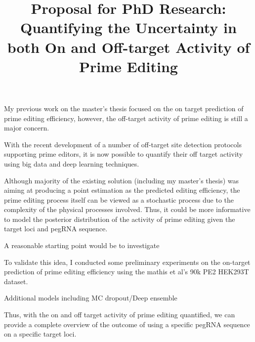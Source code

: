 \documentclass[a4,12pt]{article}
\title{Proposal for PhD Research: 
Quantifying the Uncertainty in both On and Off-target Activity of Prime Editing}
\author{}
\date{}
\begin{document}
\maketitle

My previous work on the master's thesis focused on the on target prediction of prime editing efficiency, however, the off-target activity of prime editing is still a major concern. 

With the recent development of a number of off-target site detection protocols supporting prime editors, it is now possible to quantify their off target activity using big data and deep learning techniques\parencite{liangGenomewideProfilingPrime2023,
zhuTrackingseqRevealsHeterogeneity2024}.

Although majority of the existing solution (including my master's thesis) was aiming at producing a point estimation as the predicted editing efficiency\parencite{mathisMachineLearningPrediction2024,yuPredictionEfficienciesDiverse2023,koeppelPredictionPrimeEditing2023}, the prime editing process itself can be viewed as a stochastic process due to the complexity of the physical processes involved. Thus, it could be more informative to model the posterior distribution of the activity of prime editing given the target loci and pegRNA sequence.

A reasonable starting point would be to investigate 

To validate this idea, I conducted some preliminary experiments on the on-target prediction of prime editing efficiency using the mathis et al's 90k PE2 HEK293T dataset\parencite{mathisPredictingPrimeEditing2023}.


Additional models including MC dropout/Deep ensemble

Thus, with the on and off target activity of prime editing quantified, we can provide a complete overview of the outcome of using a specific pegRNA sequence on a specific target loci. 

\printbibliography
\end{document}
